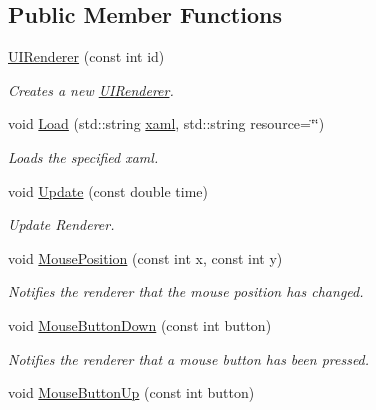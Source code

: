 \subsection*{Public Member Functions}
\begin{DoxyCompactItemize}
\item 
\hypertarget{class_u_i_renderer_a8e0fb11ab4e123f3524756e276199351}{\hyperlink{class_u_i_renderer_a8e0fb11ab4e123f3524756e276199351}{U\-I\-Renderer} (const int id)}\label{class_u_i_renderer_a8e0fb11ab4e123f3524756e276199351}

\begin{DoxyCompactList}\small\item\em Creates a new \hyperlink{class_u_i_renderer}{U\-I\-Renderer}. \end{DoxyCompactList}\item 
void \hyperlink{class_u_i_renderer_a8e61394cd4b9dcf2242f1ec47e95ba5d}{Load} (std\-::string \hyperlink{class_u_i_renderer_ad9cc0fe1fcbf5e5182f7a18045c4ec07}{xaml}, std\-::string resource=\char`\"{}\char`\"{})
\begin{DoxyCompactList}\small\item\em Loads the specified xaml. \end{DoxyCompactList}\item 
void \hyperlink{class_u_i_renderer_a9304bf4f0ff00a671cf45ac5a4198004}{Update} (const double time)
\begin{DoxyCompactList}\small\item\em Update Renderer. \end{DoxyCompactList}\item 
\hypertarget{class_u_i_renderer_a305ee68738d0b1b833b73a85ca077261}{void \hyperlink{class_u_i_renderer_a305ee68738d0b1b833b73a85ca077261}{Mouse\-Position} (const int x, const int y)}\label{class_u_i_renderer_a305ee68738d0b1b833b73a85ca077261}

\begin{DoxyCompactList}\small\item\em Notifies the renderer that the mouse position has changed. \end{DoxyCompactList}\item 
\hypertarget{class_u_i_renderer_aad758939d86e2741ed7330252cfe3b74}{void \hyperlink{class_u_i_renderer_aad758939d86e2741ed7330252cfe3b74}{Mouse\-Button\-Down} (const int button)}\label{class_u_i_renderer_aad758939d86e2741ed7330252cfe3b74}

\begin{DoxyCompactList}\small\item\em Notifies the renderer that a mouse button has been pressed. \end{DoxyCompactList}\item 
\hypertarget{class_u_i_renderer_a9d72b10f66816ecb07c51025130591bf}{void \hyperlink{class_u_i_renderer_a9d72b10f66816ecb07c51025130591bf}{Mouse\-Button\-Up} (const int button)}\label{class_u_i_renderer_a9d72b10f66816ecb07c51025130591bf}


\end{DoxyCompactItemize}
